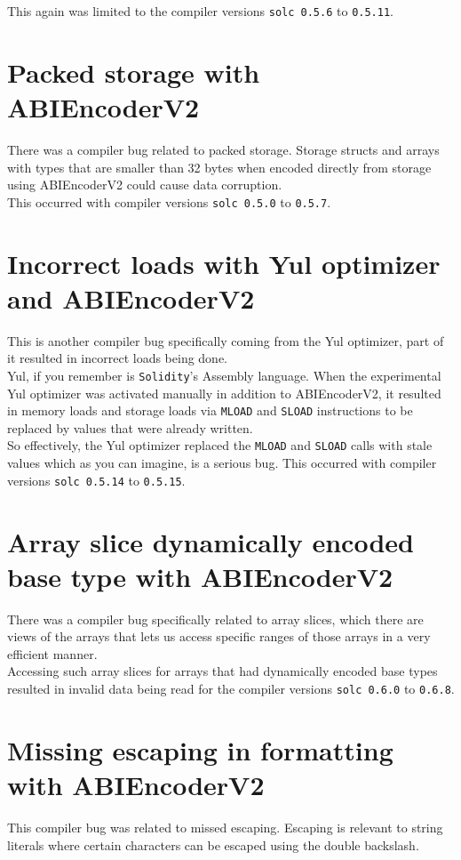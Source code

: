 This again was limited to the compiler versions \texttt{solc 0.5.6} to \texttt{0.5.11}.

\section{Packed storage with ABIEncoderV2}
There was a compiler bug related to packed storage. Storage structs and arrays with types that are smaller than 32 bytes when encoded directly from storage using ABIEncoderV2 could cause data corruption. \\

This occurred with compiler versions \texttt{solc 0.5.0} to \texttt{0.5.7}.

\section{Incorrect loads with Yul optimizer and ABIEncoderV2}
This is another compiler bug specifically coming from the Yul optimizer, part of it resulted in incorrect loads being done. \\

Yul, if you remember is \texttt{Solidity}'s Assembly language. When the experimental Yul optimizer was activated manually in addition to ABIEncoderV2, it resulted in memory loads and storage loads via \texttt{MLOAD} and \texttt{SLOAD} instructions to be replaced by values that were already written. \\

So effectively, the Yul optimizer replaced the \texttt{MLOAD} and \texttt{SLOAD} calls with stale values which as you can imagine, is a serious bug. This occurred with compiler versions \texttt{solc 0.5.14} to \texttt{0.5.15}.

\section{Array slice dynamically encoded base type with ABIEncoderV2}
There was a compiler bug specifically related to array slices, which there are views of the arrays that lets us access specific ranges of those arrays in a very efficient manner. \\

Accessing such array slices for arrays that had dynamically encoded base types resulted in invalid data being read for the compiler versions \texttt{solc 0.6.0} to \texttt{0.6.8}.

\section{Missing escaping in formatting with ABIEncoderV2}
This compiler bug was related to missed escaping. Escaping is relevant to string literals where certain characters can be escaped using the double backslash. \\


